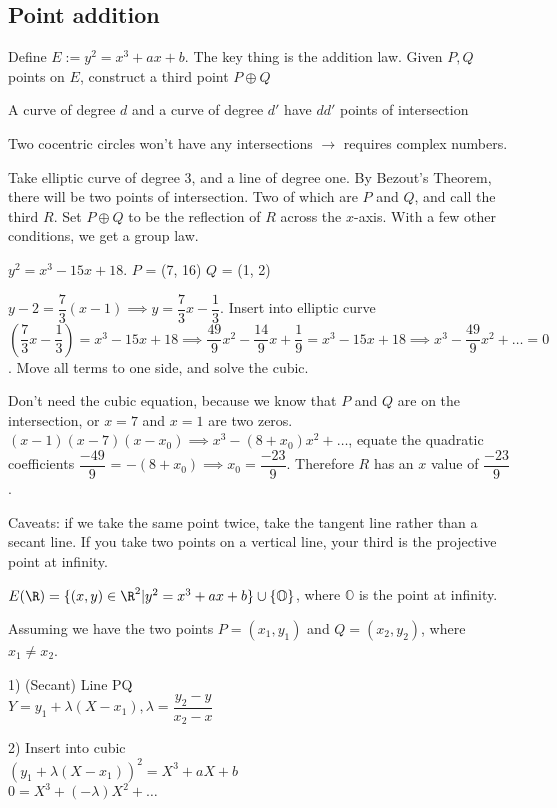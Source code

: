 \documentclass[10pt]{article}
\renewcommand{\O}{\mathbb{O}}
\begin{document}
\subsection{Point addition}
Define $E := y^2 = x^3 + ax + b$. The key thing is the addition law. Given $P, Q$ points on $E$, construct a third point $P \oplus Q$

\begin{thm}
    A curve of degree $d$ and a curve of degree $d'$ have $dd'$ points of intersection
\end{thm}
Two cocentric circles won't have any intersections $\to$ requires complex numbers. 

Take elliptic curve of degree 3, and a line of degree one. By Bezout's Theorem, there will be two points of intersection. Two of which are $P$ and $Q$, and call the third $R$. Set $P \oplus Q$ to be the reflection of $R$ across the $x$-axis. With a few other conditions, we get a group law.

\begin{exm*}
    $y^2 = x^3 - 15x + 18$. $P$ = (7, 16) $Q$ = (1, 2)
\end{exm*}
$y - 2 = \dfrac{7}{3}(x-1) \implies y = \dfrac{7}{3}x - \dfrac{1}{3}$. Insert into elliptic curve $(\dfrac{7}{3}x - \dfrac{1}{3}) = x^3 - 15x + 18 \implies \dfrac{49}{9}x^2 - \dfrac{14}{9}x + \dfrac{1}{9} = x^3 - 15x + 18 \implies x^3 - \dfrac{49}{9}x^2 + \ldots = 0$. Move all terms to one side, and solve the cubic. 

Don't need the cubic equation, because we know that $P$ and $Q$ are on the intersection, or $x = 7$ and $x = 1$ are two zeros. $(x - 1)(x - 7)(x - x_0) \implies x^3 - (8 + x_0)x^2 + \ldots$, equate the quadratic coefficients $\dfrac{-49}{9}$ = $-(8 + x_0) \implies x_0 = \dfrac{-23}{9}$. Therefore $R$ has an $x$ value of $\dfrac{-23}{9}$. 

Caveats: if we take the same point twice, take the tangent line rather than a secant line. If you take two points on a vertical line, your third is the projective point at infinity.

$E(\R) = \{(x, y) \in \R^2 | y^2 = x^3 + ax + b\} \cup \{\O\}$, where $\O$ is the point at infinity.

Assuming we have the two points $P = (x_1, y_1)$ and $Q = (x_2, y_2)$, where $x_1 \neq x_2$.

1) (Secant) Line PQ\\
$Y = y_1 + \lambda(X - x_1), \lambda = \dfrac{y_2 - y}{x_2 - x}$

2) Insert into cubic\\
$(y_1 + \lambda(X - x_1))^2 = X^3 + aX + b$\\
$0 = X^3 + (-\lambda)X^2 + \ldots$
\end{document}
